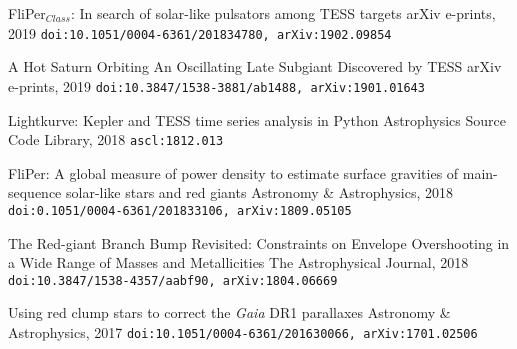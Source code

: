 \documentclass[]{k-cv} %
\begin{document}
{FliPer$_{Class}$: In search of solar-like pulsators among TESS targets}
{arXiv e-prints, 2019}
{\texttt{doi:10.1051/0004-6361/201834780, arXiv:1902.09854}}

{{A Hot Saturn Orbiting An Oscillating Late Subgiant Discovered by TESS}}
{arXiv e-prints, 2019}
{\texttt{doi:10.3847/1538-3881/ab1488, arXiv:1901.01643}}

{Lightkurve: Kepler and TESS time series analysis in Python}
{Astrophysics Source Code Library, 2018}
{\texttt{ascl:1812.013}}

{FliPer: A global measure of power density to estimate surface gravities of main-sequence solar-like stars and red giants}
{Astronomy \& Astrophysics, 2018}
{\texttt{doi:0.1051/0004-6361/201833106, arXiv:1809.05105}}

{The Red-giant Branch Bump Revisited: Constraints on Envelope Overshooting in a Wide Range of Masses and Metallicities}
{The Astrophysical Journal, 2018}
{\texttt{doi:10.3847/1538-4357/aabf90, arXiv:1804.06669}}

{Using red clump stars to correct the \emph{Gaia} DR1 parallaxes}
{Astronomy \& Astrophysics, 2017}
{\texttt{doi:10.1051/0004-6361/201630066, arXiv:1701.02506}}
\end{document}
